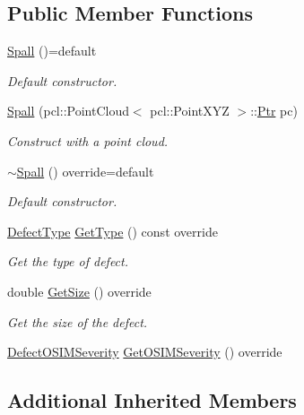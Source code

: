 \subsection*{Public Member Functions}
\begin{DoxyCompactItemize}
\item 
\hyperlink{classbeam__defects_1_1_spall_a6b4a13b64813a69284779151178459fb}{Spall} ()=default
\begin{DoxyCompactList}\small\item\em Default constructor. \end{DoxyCompactList}\item 
\hyperlink{classbeam__defects_1_1_spall_a19277f2779003d9379892c6fff087c16}{Spall} (pcl\+::\+Point\+Cloud$<$ pcl\+::\+Point\+X\+YZ $>$\+::\hyperlink{classbeam__defects_1_1_defect_a0a7708c6cd92ac482d45ef606d598325}{Ptr} pc)
\begin{DoxyCompactList}\small\item\em Construct with a point cloud. \end{DoxyCompactList}\item 
\hyperlink{classbeam__defects_1_1_spall_a0af44141e40c87c68ef20e7194476680}{$\sim$\+Spall} () override=default
\begin{DoxyCompactList}\small\item\em Default constructor. \end{DoxyCompactList}\item 
\hyperlink{group__defects_gae379b271bd5fb7ce92afe1abee917249}{Defect\+Type} \hyperlink{classbeam__defects_1_1_spall_a98572b81bfd78594f1e497758946aaa1}{Get\+Type} () const override
\begin{DoxyCompactList}\small\item\em Get the type of defect. \end{DoxyCompactList}\item 
double \hyperlink{classbeam__defects_1_1_spall_a84f5aaa8ced3ae1c61eb8f77e540c466}{Get\+Size} () override
\begin{DoxyCompactList}\small\item\em Get the size of the defect. \end{DoxyCompactList}\item 
\hyperlink{group__defects_gaed38c449f8cba57f35d1af04496a0711}{Defect\+O\+S\+I\+M\+Severity} \hyperlink{classbeam__defects_1_1_spall_a96f74134abee749d37cf750119098c4c}{Get\+O\+S\+I\+M\+Severity} () override
\end{DoxyCompactItemize}
\subsection*{Additional Inherited Members}



